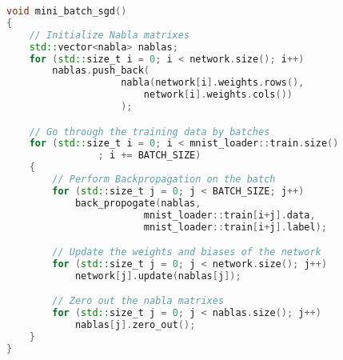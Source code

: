 \begin{lstlisting}[language=C++]
void mini_batch_sgd()
{
	// Initialize Nabla matrixes
	std::vector<nabla> nablas;
	for (std::size_t i = 0; i < network.size(); i++)
		nablas.push_back(
					nabla(network[i].weights.rows(),
						network[i].weights.cols())
					);

	// Go through the training data by batches
	for (std::size_t i = 0; i < mnist_loader::train.size()
				; i += BATCH_SIZE)
	{
		// Perform Backpropagation on the batch
		for (std::size_t j = 0; j < BATCH_SIZE; j++)
			back_propogate(nablas,
						mnist_loader::train[i+j].data,
						mnist_loader::train[i+j].label);

		// Update the weights and biases of the network
		for (std::size_t j = 0; j < network.size(); j++)
			network[j].update(nablas[j]);

		// Zero out the nabla matrixes
		for (std::size_t j = 0; j < nablas.size(); j++)
			nablas[j].zero_out();
	}
}
\end{lstlisting}